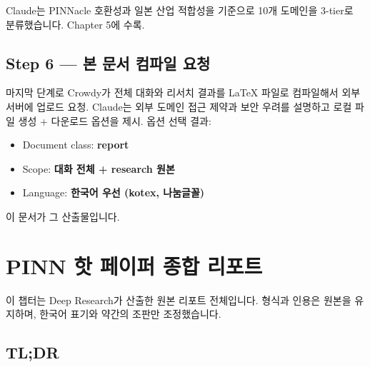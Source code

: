 \documentclass[11pt,a4paper,oneside]{report}
\begin{document}
Claude는 PINNacle 호환성과 일본 산업 적합성을 기준으로 10개 도메인을 3-tier로 분류했습니다. Chapter 5에 수록.

\section{Step 6 --- 본 문서 컴파일 요청}

마지막 단계로 Crowdy가 전체 대화와 리서치 결과를 LaTeX 파일로 컴파일해서 외부 서버에 업로드 요청. Claude는 외부 도메인 접근 제약과 보안 우려를 설명하고 로컬 파일 생성 + 다운로드 옵션을 제시. 옵션 선택 결과:
\begin{itemize}
\item Document class: \textbf{report}
\item Scope: \textbf{대화 전체 + research 원본}
\item Language: \textbf{한국어 우선 (kotex, 나눔글꼴)}
\end{itemize}
이 문서가 그 산출물입니다.

\chapter{PINN 핫 페이퍼 종합 리포트}

이 챕터는 Deep Research가 산출한 원본 리포트 전체입니다. 형식과 인용은 원본을 유지하며, 한국어 표기와 약간의 조판만 조정했습니다.

\section{TL;DR}
\end{document}
